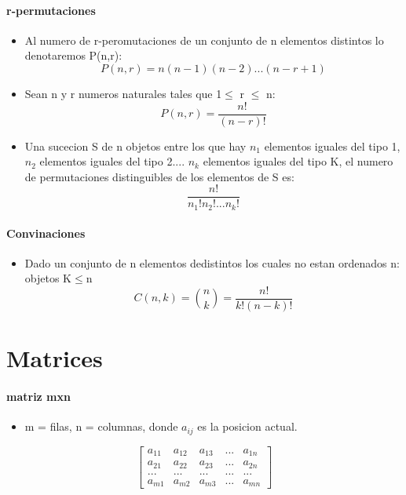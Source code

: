 \documentclass[a4paper]{article}
\begin{document}
\paragraph{r-permutaciones}
\begin{itemize}
	\item Al numero de r-peromutaciones de un conjunto de n elementos distintos lo denotaremos P(n,r):
	\begin{equation*}
		P(n,r) = n(n-1)(n-2)...(n-r+1)
	\end{equation*}

	\item Sean n y r numeros naturales tales que 1$\leq$ r $\leq$ n:
	\begin{equation*}
		P(n,r)= \dfrac{n!}{(n-r)!}
	\end{equation*}

	\item Una sucecion S de n objetos entre los que hay $n_1$ elementos iguales del tipo 1, $n_2$ elementos iguales del tipo 2.... $n_k$ elementos iguales del tipo K, el numero de permutaciones distinguibles de los elementos de S es:
	\begin{equation*}
		\dfrac{n!}{n_1!n_2!...n_k!}
	\end{equation*}
\end{itemize}

\paragraph{Convinaciones}
\begin{itemize}
	\item Dado un conjunto de n elementos dedistintos los cuales no estan ordenados n: objetos K$\leq$n
	\begin{equation}
		C(n,k) = \binom n k  = \dfrac{n!}{k!(n-k)!}
	\end{equation}
\end{itemize}

\section{Matrices}

\paragraph{matriz mxn}

\begin{itemize}
	\item m = filas, n = columnas, donde $a_{ij}$ es la posicion actual.
\end{itemize}
\begin{equation}
\left[ 
\begin{array}{ccccc}
	a_{11} & a_{12} & a_{13} & ... & a_{1n} \\
	a_{21} & a_{22} & a_{23} & ... & a_{2n} \\
	... & ... & ... & ... & ... \\
	a_{m1} & a_{m2} & a_{m3} & ... & a_{mn}
\end{array}
\right] 
\end{equation}
 
\end{document}
